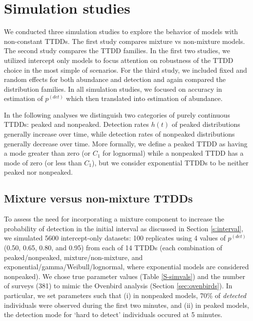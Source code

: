 \documentclass[12pt]{article}
\newcommand{\pdet}{p^{(det)}}
\begin{document}
\section{Simulation studies} \label{sec:sim}

We conducted three simulation studies to explore the behavior of models with non-constant TTDDs.
The first study compares mixture vs non-mixture models.
The second study compares the TTDD families.
In the first two studies, we utilized intercept only models to focus attention on robustness of the TTDD choice in the most simple of scenarios.
For the third study, we included fixed and random effects for both abundance and detection and again compared the distribution families. 
In all simulation studies, we focused on accuracy in estimation of $\pdet$ which then translated into estimation of abundance. 

In the following analyses we distinguish two categories of purely continuous TTDDs: peaked and nonpeaked.  
Detection rates $h(t)$ of peaked distributions generally increase over time, while detection rates of nonpeaked distributions generally decrease over time.
More formally, we define a peaked TTDD as having a mode greater than zero (or $C_1$ for lognormal) while a nonpeaked TTDD has a mode of zero (or less than $C_1$), but we consider exponential TTDDs to be neither peaked nor nonpeaked.









\subsection{Mixture versus non-mixture TTDDs}\label{sec:mixture}

To assess the need for incorporating a mixture component to increase the probability of detection in the initial interval as discussed in Section \ref{s:interval}, we simulated 5600 intercept-only datasets: 100 replicates using 4 values of $\pdet$ (0.50, 0.65, 0.80, and 0.95) from each of 14 TTDDs (each combination of peaked/nonpeaked, mixture/non-mixture, and exponential/gamma/Weibull/lognormal, where exponential models are considered nonpeaked).  
We chose true parameter values (Table \ref{S-simvals}) and the number of surveys (381) to mimic the Ovenbird analysis (Section \ref{sec:ovenbirds}).  
In particular, we set parameters such that (i) in nonpeaked models, 70\% of \textit{detected} individuals were observed during the first two minutes, and (ii) in peaked models, the detection mode for `hard to detect' individuals occured at 5 minutes.
\end{document}
